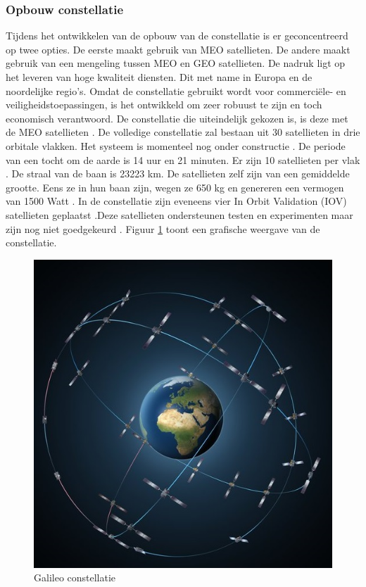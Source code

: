 \subsubsection{Opbouw constellatie}
Tijdens het ontwikkelen van de opbouw van de constellatie is er geconcentreerd op twee opties. De eerste maakt gebruik van MEO satellieten. De andere maakt gebruik van een mengeling tussen MEO en GEO satellieten. De nadruk ligt op het leveren van hoge kwaliteit diensten. Dit met name in Europa en de noordelijke regio's. Omdat de constellatie gebruikt wordt voor commerci\"ele- en veiligheidstoepassingen, is het ontwikkeld om zeer robuust te zijn en toch economisch verantwoord. De constellatie die uiteindelijk gekozen is, is deze met de MEO satellieten \cite{LBibGalileo2}. De volledige constellatie zal bestaan uit 30 satellieten in drie orbitale vlakken. Het systeem is momenteel nog onder constructie \cite{LBibGNSS4}. De periode van een tocht om de aarde is 14 uur en 21 minuten. Er zijn 10 satellieten per vlak \cite{LBibGNSS6}. De straal van de baan is 23223 km. De satellieten zelf zijn van een gemiddelde grootte. Eens ze in hun baan zijn, wegen ze 650 kg en genereren een vermogen van 1500 Watt \cite{LBibGalileo2}. In de constellatie zijn eveneens vier In Orbit Validation (IOV) satellieten geplaatst \cite{LBibBeiDou3,LBibPPP2}.Deze satellieten ondersteunen testen en experimenten maar zijn nog niet goedgekeurd \cite{LBibGNSS9}. Figuur \ref{imgGalileo} toont een grafische weergave van de constellatie.

\begin{figure}[hpb]
	\includegraphics[scale=1.75]{Galileo.jpg}
	\caption{Galileo constellatie \cite{LImgGalileo}}
	\label{imgGalileo}
\end{figure} 

